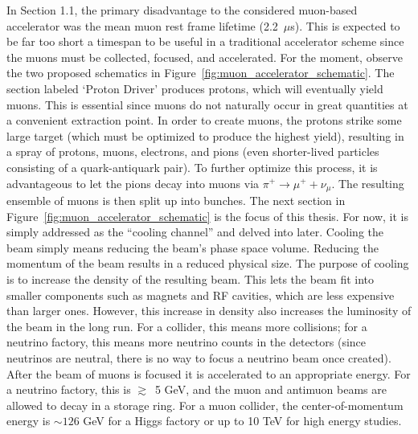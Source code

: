 In Section 1.1, the primary disadvantage to the considered muon-based accelerator was the mean muon rest frame lifetime (2.2~$\mu$s). This is expected to be far too short a timespan to be useful in a traditional accelerator scheme since the muons must be collected, focused, and accelerated. For the moment, observe the two proposed schematics in Figure~\ref{fig:muon_accelerator_schematic}\cite{map}. The section labeled `Proton Driver' produces protons, which will eventually yield muons. This is essential since muons do not naturally occur in great quantities at a convenient extraction point. In order to create muons, the protons strike some large target (which must be optimized to produce the highest yield), resulting in a spray of protons, muons, electrons, and pions (even shorter-lived particles consisting of a quark-antiquark pair). To further optimize this process, it is advantageous to let the pions decay into muons via $\pi^+ \rightarrow \mu^+ + \nu_\mu$. The resulting ensemble of muons is then split up into bunches. The next section in Figure~\ref{fig:muon_accelerator_schematic} is the focus of this thesis. For now, it is simply addressed as the ``cooling channel'' and delved into later. Cooling the beam simply means reducing the beam's phase space volume. Reducing the momentum of the beam results in a reduced physical size. The purpose of cooling is to increase the density of the resulting beam. This lets the beam fit into smaller components such as magnets and RF cavities, which are less expensive than larger ones. However, this increase in density also increases the luminosity of the beam in the long run. For a collider, this means more collisions; for a neutrino factory, this means more neutrino counts in the detectors (since neutrinos are neutral, there is no way to focus a neutrino beam once created). After the beam of muons is focused it is accelerated to an appropriate energy. For a neutrino factory, this is $\gtrsim$~5 GeV, and the muon and antimuon beams are allowed to decay in a storage ring. For a muon collider, the center-of-momentum energy is $\sim 126$ GeV for a Higgs factory or up to 10 TeV for high energy studies.

